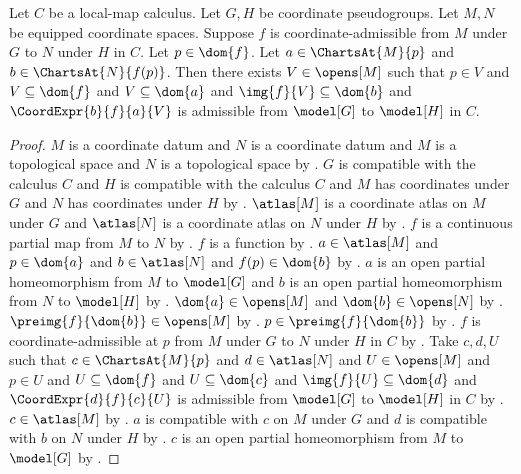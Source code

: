 \begin{theorem}\label{coordinate_admissible_in_any_charts}
    Let $C$ be a local-map calculus.
    Let $G,H$ be coordinate pseudogroups.
    Let $M,N$ be equipped coordinate spaces.
    Suppose $f$ is coordinate-admissible from $M$ under $G$ to $N$ under $H$ in $C$.
    Let $p\in\dom{f}$.
    Let $a\in\ChartsAt{M}{p}$ and $b\in\ChartsAt{N}{f(p)}$.
    Then there exists $V\in\opens[M]$ such that $p\in V$ and
        $V\subseteq\dom{f}$ and $V\subseteq\dom{a}$ and $\img{f}{V}\subseteq\dom{b}$ and
        $\CoordExpr{b}{f}{a}{V}$ is admissible from $\model[G]$ to $\model[H]$ in $C$.
\end{theorem}
\begin{proof}
    $M$ is a coordinate datum and $N$ is a coordinate datum and
        $M$ is a topological space and $N$ is a topological space by .
    $G$ is compatible with the calculus $C$ and $H$ is compatible with the calculus $C$ and
        $M$ has coordinates under $G$ and $N$ has coordinates under $H$ by
        .
    $\atlas[M]$ is a coordinate atlas on $M$ under $G$ and
        $\atlas[N]$ is a coordinate atlas on $N$ under $H$ by .
    $f$ is a continuous partial map from $M$ to $N$ by .
    $f$ is a function by .
    $a\in\atlas[M]$ and $p\in\dom{a}$ and
        $b\in\atlas[N]$ and $f(p)\in\dom{b}$ by .
    $a$ is an open partial homeomorphism from $M$ to $\model[G]$ and
        $b$ is an open partial homeomorphism from $N$ to $\model[H]$ by .
    $\dom{a}\in\opens[M]$ and $\dom{b}\in\opens[N]$ by .
    $\preimg{f}{\dom{b}}\in\opens[M]$ by .
    $p\in\preimg{f}{\dom{b}}$ by .
    $f$ is coordinate-admissible at $p$ from $M$ under $G$ to $N$ under $H$ in $C$ by
        .
    Take $c,d,U$ such that $c\in\ChartsAt{M}{p}$ and $d\in\atlas[N]$ and
        $U\in\opens[M]$ and $p\in U$ and $U\subseteq\dom{f}$ and $U\subseteq\dom{c}$ and
        $\img{f}{U}\subseteq\dom{d}$ and
        $\CoordExpr{d}{f}{c}{U}$ is admissible from $\model[G]$ to $\model[H]$ in $C$
        by .
    $c\in\atlas[M]$ by .
    $a$ is compatible with $c$ on $M$ under $G$ and
        $d$ is compatible with $b$ on $N$ under $H$ by .
    $c$ is an open partial homeomorphism from $M$ to $\model[G]$ by .

\end{proof}
